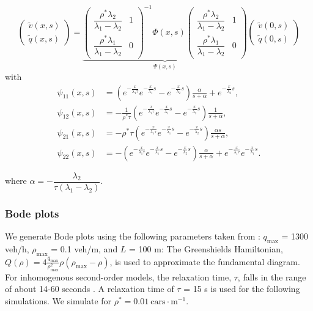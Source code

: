 \documentclass[preprint]{elsarticle}
\begin{document}
\begin{equation}
\begin{pmatrix}
\widetilde{v}(x,s) \\ \widetilde{q}(x,s)
\end{pmatrix} = \underbrace{ \begin{pmatrix}
\dfrac{\rho^*\lambda_2}{\lambda_1-\lambda_2} & 1\\
\dfrac{\rho^*\lambda_1}{\lambda_1-\lambda_2} & 0
\end{pmatrix}^{-1} \Phi(x,s) 
\begin{pmatrix}
\dfrac{\rho^*\lambda_2}{\lambda_1-\lambda_2} & 1\\
\dfrac{\rho^*\lambda_1}{\lambda_1-\lambda_2} & 0
\end{pmatrix} }_\text{$\Psi (x,s)$} \begin{pmatrix}
\widetilde{v}(0,s) \\ \widetilde{q}(0,s)
\end{pmatrix}
\end{equation}
with
\begin{subequations}
\begin{align}
\psi_{11}(x,s) &=\left(e^{-\frac{x}{\lambda_{1}\tau}}e^{-\frac{x}{\lambda_{1}}s}-e^{-\frac{x}{\lambda_{2}}s}\right)\frac{\alpha}{s+\alpha}+e^{-\frac{x}{\lambda_{2}}s}, \\
\psi_{12}(x,s)&=-\frac{1}{\rho^* \tau}\left(e^{-\frac{x}{\lambda_{1}\tau}}e^{-\frac{x}{\lambda_{1}}s}-e^{-\frac{x}{\lambda_{2}}s}\right)\frac{1}{s+\alpha}, \\
\psi_{21}(x,s)&=-\rho^{*} \tau\left(e^{-\frac{x}{\lambda_{1}\tau}}e^{-\frac{x}{\lambda_{1}}s}-e^{-\frac{x}{\lambda_{2}}s}\right)\frac{\alpha s}{s+\alpha}, \\
\psi_{22}(x,s)&=-\left(e^{-\frac{x}{\lambda_{1}\tau}}e^{-\frac{x}{\lambda_{1}}s}-e^{-\frac{x}{\lambda_{2}}s}\right)\frac{\alpha}{s+\alpha}+e^{-\frac{x}{\lambda_{1}\tau}}e^{-\frac{x}{\lambda_{1}}s}.
\end{align}
\end{subequations}

where $\alpha = -\dfrac{\lambda_2}{\tau(\lambda_1 - \lambda_2)}$. 

\subsubsection{Bode plots}

We generate Bode plots using the following parameters taken from \cite{Hofleitner}: $q_{\text{max}}$ = 1300 veh/h, $\rho_{\text{max}}$ = 0.1 veh/m, and $L$ = 100 m: The Greenshields Hamiltonian, $Q( \rho) = 4 \frac{q_{\text{max}}}{\rho_{\text{max}}^2}\rho (\rho_{\text{max}} - \rho)$, is used to approximate the fundamental diagram. For inhomogenous second-order models, the relaxation time, $\tau$, falls in the range of about 14-60 seconds \cite{Fan}. A relaxation time of $\tau$ = 15 s is used for the following simulations. We simulate for $\rho^* = 0.01\:\text{cars}\cdot\text{m}^{-1}$. \\
\end{document}
